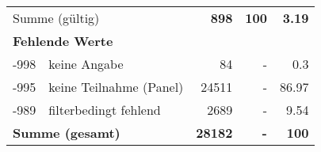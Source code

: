 \begin{longtable}{lXrrr}
     \midrule
     \multicolumn{2}{l}{Summe (gültig)} &
       \textbf{\num{898}} &
     \textbf{100} &
       \textbf{\num[round-mode=places,round-precision=2]{3.19}} \\
     \multicolumn{5}{l}{\textbf{Fehlende Werte}}\\
       -998 &
       keine Angabe &
         \num{84} &
        - &
         \num[round-mode=places,round-precision=2]{0.3} \\
       -995 &
       keine Teilnahme (Panel) &
         \num{24511} &
        - &
         \num[round-mode=places,round-precision=2]{86.97} \\
       -989 &
       filterbedingt fehlend &
         \num{2689} &
        - &
         \num[round-mode=places,round-precision=2]{9.54} \\
     \midrule
     \multicolumn{2}{l}{\textbf{Summe (gesamt)}} &
          \textbf{\num{28182}} &
        \textbf{-} &
        \textbf{100} \\
     \bottomrule
     \end{longtable}
     
